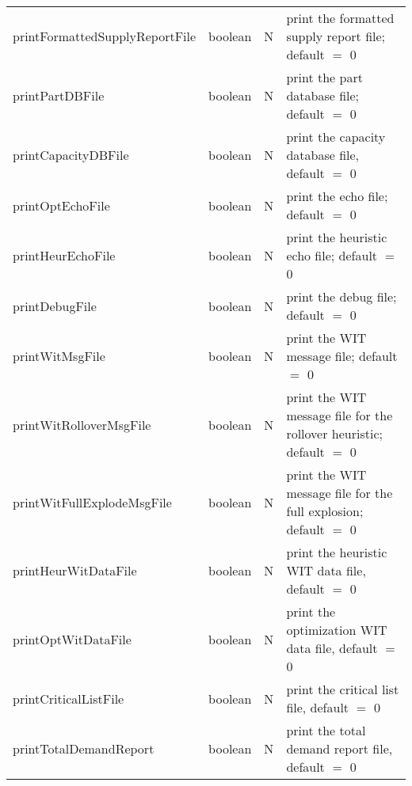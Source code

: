 \begin{minipage}{7.5in}
\begin{tabular}{lllp{3.5in}}
printFormattedSupplyReportFile & boolean & N & print the formatted 
      supply report file; default $=$ 0 \\
printPartDBFile & boolean & N & print the part database file; default $=$ 0 \\
printCapacityDBFile & boolean & N & print the capacity database file, 
     default $=$ 0 \\
printOptEchoFile & boolean & N & print the echo file; default $=$ 0\\
printHeurEchoFile & boolean & N & print the heuristic 
      echo file; default $=$ 0\\
printDebugFile & boolean & N & print the debug file; default $=$ 0\\
printWitMsgFile & boolean & N & print the WIT message file; default $=$ 0\\
printWitRolloverMsgFile & boolean & N & print the WIT message file for
   the rollover heuristic; default $=$ 0\\
printWitFullExplodeMsgFile & boolean & N & print the WIT message file for the
   full explosion; default $=$ 0\\ 
printHeurWitDataFile & boolean & N & print the heuristic WIT data file,
      default $=$ 0\\ 
printOptWitDataFile & boolean & N & print the optimization WIT data file,
      default $=$ 0\\ 
printCriticalListFile & boolean & N & print the critical list file,
      default $=$ 0\\ 
printTotalDemandReport & boolean & N & print the total demand report file, 
      default $=$ 0
\end{tabular}
\end{minipage}

\vspace{0.5in}

